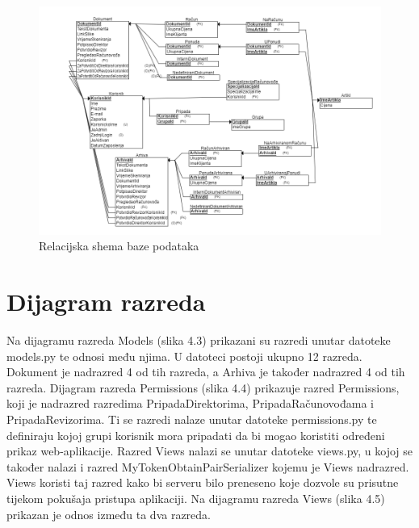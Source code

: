 			\begin{figure}[H]
				\includegraphics[width=\textwidth]{slike/Relacijska_shema.png} %
				\caption{Relacijska shema baze podataka}
				\label{fig:relacijska_shema} %
			\end{figure}

			\eject
			
			
		\section{Dijagram razreda}
		
			Na dijagramu razreda Models (slika 4.3) prikazani su razredi unutar datoteke models.py te
			odnosi među njima. U datoteci postoji ukupno 12 razreda. Dokument je nadrazred 4 od tih razreda, a Arhiva
			je također nadrazred 4 od tih razreda.
			\newline
			Dijagram razreda Permissions (slika 4.4) prikazuje razred Permissions,
			koji je nadrazred razredima PripadaDirektorima, PripadaRačunovođama i PripadaRevizorima. Ti se
			razredi nalaze unutar datoteke permissions.py te definiraju kojoj grupi korisnik mora pripadati
			da bi mogao koristiti određeni prikaz web-aplikacije.
			\newline
			Razred Views nalazi se unutar datoteke views.py, u kojoj se također nalazi i razred
			MyTokenObtainPairSerializer kojemu je Views nadrazred. Views koristi taj razred kako bi
			serveru bilo preneseno koje dozvole su prisutne tijekom pokušaja pristupa aplikaciji.
			Na dijagramu razreda Views (slika 4.5) prikazan je odnos između ta dva razreda. 
			
